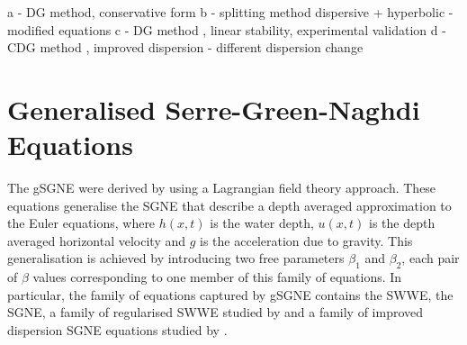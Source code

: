 \documentclass[10pt]{elsarticle}
\begin{document}
a \cite{DONG-2016-110}  - DG method, conservative form
b \cite{LANNES-2015-238} - splitting method dispersive + hyperbolic - modified equations
c \cite{PANDA-2014-572} - DG method , linear stability, experimental validation
d \cite{LI-2019-108953} - CDG method , improved dispersion - different dispersion change
\section{Generalised Serre-Green-Naghdi Equations}
The gSGNE were derived by \citet{Clamond-Dutykh-2018-237} using a Lagrangian field theory approach. These equations generalise the SGNE that describe a depth averaged approximation to the Euler equations, where $h(x,t)$ is the water depth, $u(x,t)$ is the depth averaged horizontal velocity and $g$ is the acceleration due to gravity. This generalisation is achieved by introducing two free parameters $\beta_1$ and $\beta_2$, each pair of $\beta$ values corresponding to one member of this family of equations. In particular, the family of equations captured by gSGNE contains the SWWE, the SGNE, a family of regularised SWWE studied by \citet{Clamond-Dutykh-2018-237} and a family of improved dispersion SGNE equations studied by \citet{Clamond-et.al-2017-245}.
\end{document}
